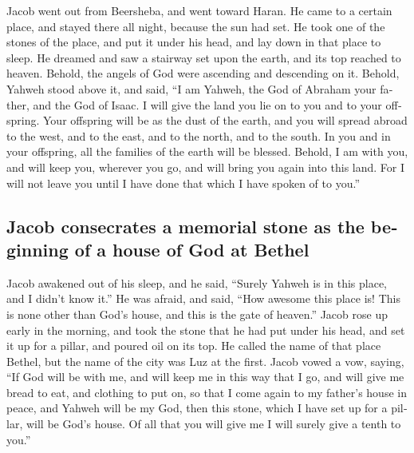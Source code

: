 \begin{paracol}{2}
\begin{otherlanguage}{english}
 Jacob went out from Beersheba, and went toward Haran.
 He came to a certain place, and stayed there all night,
because the sun had set. He took one of the stones of the place, and put
it under his head, and lay down in that place to sleep. 
He dreamed and saw a stairway set upon the earth, and its top reached to
heaven. Behold, the angels of God were ascending and descending on it.
 Behold, Yahweh stood above it, and said, ``I am Yahweh,
the God of Abraham your father, and the God of Isaac. I will give the
land you lie on to you and to your offspring.  Your
offspring will be as the dust of the earth, and you will spread abroad
to the west, and to the east, and to the north, and to the south. In you
and in your offspring, all the families of the earth will be blessed.
 Behold, I am with you, and will keep you, wherever you
go, and will bring you again into this land. For I will not leave you
until I have done that which I have spoken of to you.''

\hypertarget{jacob-consecrates-a-memorial-stone-as-the-beginning-of-a-house-of-god-at-bethel}{%
\subsection{Jacob consecrates a memorial stone as the beginning of a
house of God at
Bethel}\label{jacob-consecrates-a-memorial-stone-as-the-beginning-of-a-house-of-god-at-bethel}}

 Jacob awakened out of his sleep, and he said, ``Surely
Yahweh is in this place, and I didn't know it.''  He was
afraid, and said, ``How awesome this place is! This is none other than
God's house, and this is the gate of heaven.''  Jacob
rose up early in the morning, and took the stone that he had put under
his head, and set it up for a pillar, and poured oil on its top.
 He called the name of that place Bethel, but the name of
the city was Luz at the first.  Jacob vowed a vow,
saying, ``If God will be with me, and will keep me in this way that I
go, and will give me bread to eat, and clothing to put on,
 so that I come again to my father's house in peace, and
Yahweh will be my God,  then this stone, which I have set
up for a pillar, will be God's house. Of all that you will give me I
will surely give a tenth to you.''

\end{otherlanguage}


\end{paracol}
